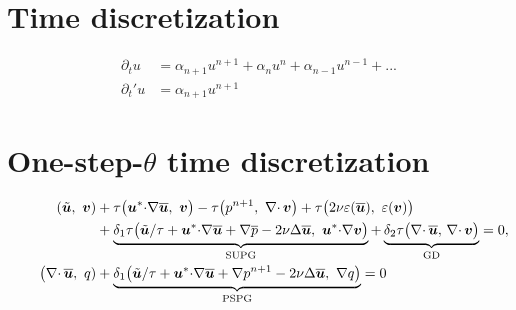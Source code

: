 \documentclass[onefignum,onetabnum]{siamart190516}
\begin{document}
\section{Time discretization}

\begin{align*}
\partial_t u &=  \alpha_{n+1} u^{n+1} + \alpha_{n} u^{n} + \alpha_{n-1} u^{n-1} + ... \\
\partial_t' u &=  \alpha_{n+1} u^{n+1} 
\end{align*}

%


\section{One-step-$\theta$ time discretization}

\begin{equation}
  \begin{aligned}
    \left( \tilde{{\boldsymbol u}} ,\  {\boldsymbol v} \right) 
    &+ \tau \big( {\boldsymbol u}^* {\cdot} \nabla \overline{{\boldsymbol u}},\ {\boldsymbol v} \big)
    - \tau \big( p^{n+1},\ \nabla{\cdot\,} {\boldsymbol v} \big) + 
    \tau \big( 2 \nu \varepsilon(\overline{{\boldsymbol u}}),\ \varepsilon({\boldsymbol v}) \big) \\
    & 
    +  
    \underbrace{\delta_1 \tau \big(\tilde{{\boldsymbol u}}/\tau +  {\boldsymbol u}^* {\cdot} \nabla \overline{{\boldsymbol u}} + \nabla \overline{p} - 2 \nu \Delta \overline{{\boldsymbol u}}, \
    {\boldsymbol u}^* {\cdot} \nabla {\boldsymbol v}\big)}_{\text{SUPG}}  +
    \underbrace{\delta_2 \tau \big(\nabla{\cdot\,} \overline{{\boldsymbol u}}, \, \nabla{\cdot\,} {\boldsymbol v} \big)}_{\text{GD}}
    =0, \\
    \hspace{2.2em} 
    \big( \nabla{\cdot\,} \overline{{\boldsymbol u}},\ q)&
    + \underbrace{\delta_1 \big( \tilde{{\boldsymbol u}}/\tau +  {\boldsymbol u}^* {\cdot} \nabla \overline{{\boldsymbol u}} + \nabla p^{n+1}  - 2 \nu \Delta \overline{{\boldsymbol u}},\ \nabla q \big)}_{\text{PSPG}} = 0 
  \end{aligned}
\end{equation}
\end{document}
